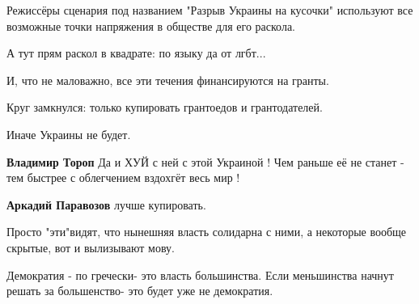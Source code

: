\begin{itemize}
Режиссёры сценария под названием "Разрыв Украины на кусочки" используют все
возможные точки напряжения в обществе для его раскола.

А тут прям раскол в квадрате: по языку да от лгбт...

И, что не маловажно, все эти течения финансируются на гранты.

Круг замкнулся: только купировать грантоедов и грантодателей.

Иначе Украины не будет.

\begin{itemize}
 
\textbf{Владимир Тороп} Да и ХУЙ с ней с этой Украиной ! Чем раньше её не станет - тем быстрее с облегчением вздохгёт весь мир !

 
\textbf{Аркадий Паравозов} лучше купировать.
\end{itemize}

 
Просто "эти"видят, что нынешняя власть солидарна с ними, а некоторые вообще скрытые, вот и вылизывают мову.

 
Демократия - по гречески- это власть большинства. Если меньшинства начнут решать за большенство- это будет уже не демократия.

 

\end{itemize}
